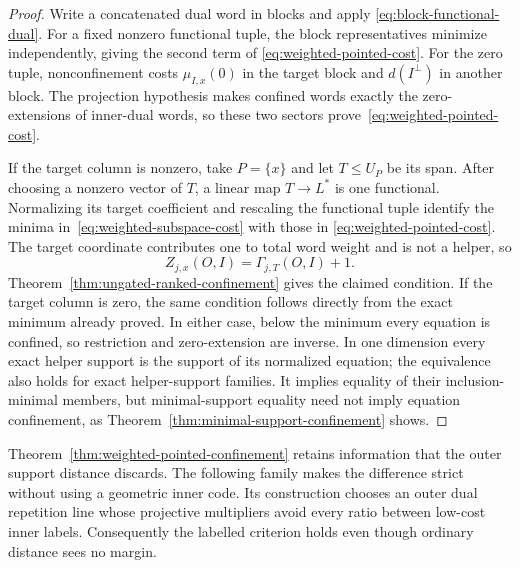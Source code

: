 \begin{proof}
Write a concatenated dual word in blocks and apply
\eqref{eq:block-functional-dual}.  For a fixed nonzero functional tuple, the
block representatives minimize independently, giving the second term of
\eqref{eq:weighted-pointed-cost}.  For the zero tuple, nonconfinement costs
$\mu_{I,x}(0)$ in the target block and $d(I^\perp)$ in another block.  The
projection hypothesis makes confined words exactly the zero-extensions of
inner-dual words, so these two sectors prove~\eqref{eq:weighted-pointed-cost}.

If the target column is nonzero, take $P=\{x\}$ and let $T\leq U_P$ be its
span.  After choosing a nonzero vector of $T$, a linear map $T\to L^*$ is one
functional.  Normalizing its target coefficient and rescaling the functional
tuple identify the minima in~\eqref{eq:weighted-subspace-cost} with those in
\eqref{eq:weighted-pointed-cost}.  The target coordinate contributes one to
total word weight and is not a helper, so
\[
 Z_{j,x}(O,I)=\Gamma_{j,T}(O,I)+1.
\]
Theorem~\ref{thm:ungated-ranked-confinement} gives the claimed condition.  If the
target column is zero, the same condition follows directly from the exact minimum
already proved.  In either case, below the minimum every equation is confined,
so restriction and zero-extension are inverse.  In one dimension every exact
helper support is the support of its normalized equation; the equivalence also
holds for exact helper-support families.  It implies equality of their
inclusion-minimal members, but minimal-support equality need not imply
equation confinement, as Theorem~\ref{thm:minimal-support-confinement} shows.
%
%
\end{proof}

Theorem~\ref{thm:weighted-pointed-confinement} retains information that the
outer support distance discards.  The following family makes the difference
strict without using a geometric inner code.  Its construction chooses an
outer dual repetition line whose projective multipliers avoid every ratio
between low-cost inner labels.  Consequently the labelled criterion holds even
though ordinary distance sees no margin.

